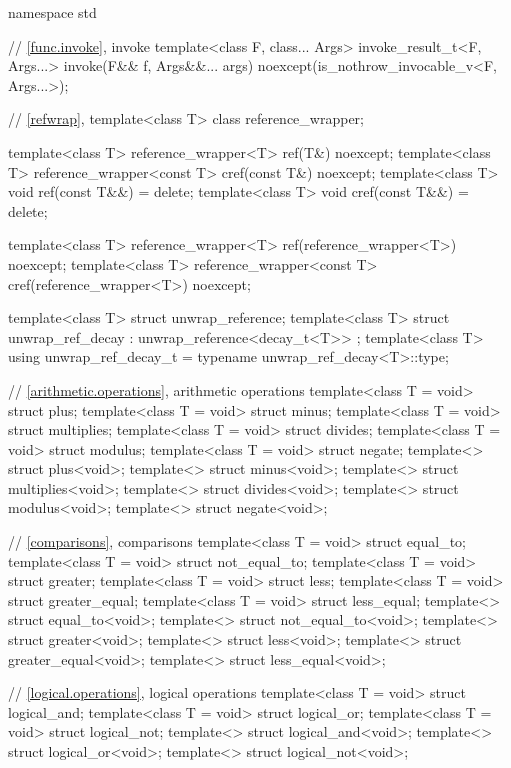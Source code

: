 %
%
%
\begin{codeblock}
namespace std {
  // \ref{func.invoke}, invoke
  template<class F, class... Args>
    invoke_result_t<F, Args...> invoke(F&& f, Args&&... args)
      noexcept(is_nothrow_invocable_v<F, Args...>);

  // \ref{refwrap}, 
  template<class T> class reference_wrapper;

  template<class T> reference_wrapper<T> ref(T&) noexcept;
  template<class T> reference_wrapper<const T> cref(const T&) noexcept;
  template<class T> void ref(const T&&) = delete;
  template<class T> void cref(const T&&) = delete;

  template<class T> reference_wrapper<T> ref(reference_wrapper<T>) noexcept;
  template<class T> reference_wrapper<const T> cref(reference_wrapper<T>) noexcept;

  template<class T> struct unwrap_reference;
  template<class T> struct unwrap_ref_decay : unwrap_reference<decay_t<T>> {};
  template<class T> using unwrap_ref_decay_t = typename unwrap_ref_decay<T>::type;

  // \ref{arithmetic.operations}, arithmetic operations
  template<class T = void> struct plus;
  template<class T = void> struct minus;
  template<class T = void> struct multiplies;
  template<class T = void> struct divides;
  template<class T = void> struct modulus;
  template<class T = void> struct negate;
  template<> struct plus<void>;
  template<> struct minus<void>;
  template<> struct multiplies<void>;
  template<> struct divides<void>;
  template<> struct modulus<void>;
  template<> struct negate<void>;

  // \ref{comparisons}, comparisons
  template<class T = void> struct equal_to;
  template<class T = void> struct not_equal_to;
  template<class T = void> struct greater;
  template<class T = void> struct less;
  template<class T = void> struct greater_equal;
  template<class T = void> struct less_equal;
  template<> struct equal_to<void>;
  template<> struct not_equal_to<void>;
  template<> struct greater<void>;
  template<> struct less<void>;
  template<> struct greater_equal<void>;
  template<> struct less_equal<void>;

  // \ref{logical.operations}, logical operations
  template<class T = void> struct logical_and;
  template<class T = void> struct logical_or;
  template<class T = void> struct logical_not;
  template<> struct logical_and<void>;
  template<> struct logical_or<void>;
  template<> struct logical_not<void>;

}
\end{codeblock}
